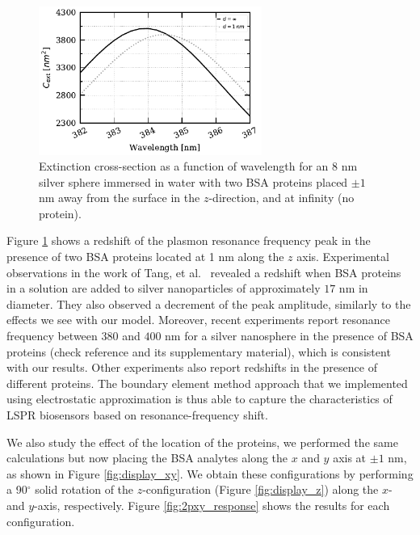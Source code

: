 \begin{figure} %
    \centering
    \includegraphics[width=0.65\textwidth]{2pz_R8nm.pdf} 
    \caption{Extinction cross-section as a function of wavelength for an $8$ nm
             silver sphere immersed in water with two BSA proteins placed 
             $\pm 1$ nm away from the surface in the $z$-direction, and at
             infinity (no protein).}
    \label{fig:2pz_response}
 \end{figure}

Figure \ref{fig:2pz_response} shows a redshift of the plasmon resonance frequency 
peak in the presence of two BSA proteins located at 1 nm along the $z$ axis. Experimental 
observations in the work of Tang, et al.~\cite{TangETal2010} revealed a redshift when 
BSA proteins in a solution are added to silver nanoparticles of approximately $17$ nm 
in diameter. They also observed a decrement of the peak amplitude, similarly to the 
effects we see with our model. Moreover, recent experiments \cite{PuETal2018} report 
resonance frequency between $380$ and $400$ nm for a silver nanosphere in the presence
of BSA proteins (check reference and its supplementary material), which is consistent with 
our results. Other experiments \cite{RaphaelETal2013} also report redshifts in the presence
of different proteins. The boundary element method approach that we implemented using 
electrostatic approximation is thus able to capture the characteristics of LSPR biosensors
based on resonance-frequency shift. 

We also study the effect of the location of the proteins, we performed the same 
calculations but now placing the BSA analytes along the $x$ and $y$ axis at $\pm 1$ nm,
as shown in Figure \ref{fig:display_xy}. We obtain these configurations by performing
a 90$^\circ$ solid rotation of the $z$-configuration (Figure \ref{fig:display_z})
along the $x$- and $y$-axis, respectively. Figure \ref{fig:2pxy_response} shows the 
results for each configuration.

